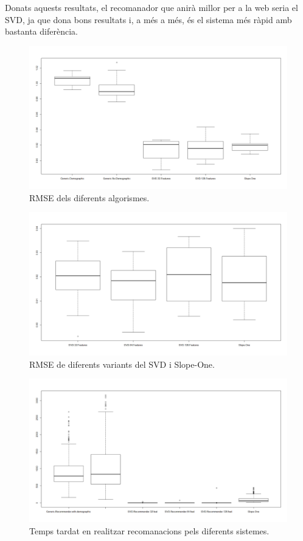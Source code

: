 Donats aquests resultats, el recomanador que anirà millor per a la web seria el SVD, ja que dona bons resultats i, a més a més, és el sistema més ràpid amb bastanta diferència.

\begin{figure}[h]
  \caption{RMSE dels diferents algorismes.}
  \label{figure-rmse-scores}
  \centering
    \includegraphics[width=\textwidth]{figs/resultats_10iter.png}
\end{figure}

\begin{figure}[h]
  \caption{RMSE de diferents variants del SVD i Slope-One.}
  \label{figure-rmse-scores-specific}
  \centering
    \includegraphics[width=\textwidth]{figs/resultats_20iter_specific.png}
\end{figure}

\begin{figure}[h]
  \caption{Temps tardat en realitzar recomanacions pels diferents sistemes.}
  \label{figure-recommender-speed}
  \centering
    \includegraphics[width=\textwidth]{figs/times.png}
\end{figure}


